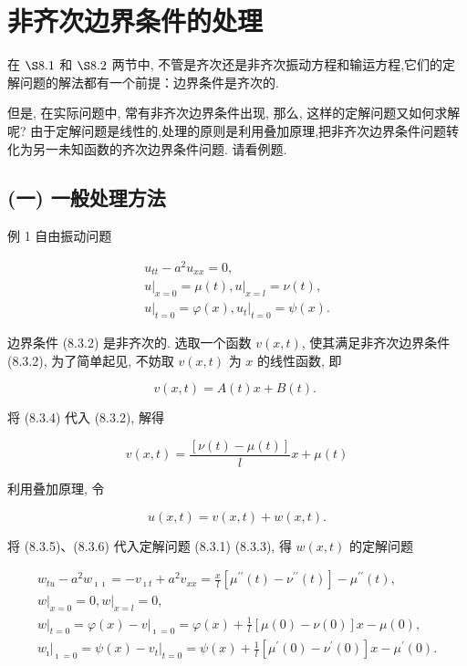 \section{非齐次边界条件的处理}
\label{eq:inhomo_boundary}

在 $\S 8.1$ 和 $\S 8.2$ 两节中, 不管是齐次还是非齐次振动方程和输运方程,它们的定解问题的解法都有一个前提：边界条件是齐次的.

但是, 在实际问题中, 常有非齐次边界条件出现, 那么, 这样的定解问题又如何求解呢? 由于定解问题是线性的,处理的原则是利用叠加原理,把非齐次边界条件问题转化为另一未知函数的齐次边界条件问题. 请看例题.

\subsection{(一) 一般处理方法}
例 1 自由振动问题

$$
\begin{gathered}
u_{t t}-a^{2} u_{x x}=0, \\
\left.u\right|_{x=0}=\mu(t),\left.u\right|_{x=l}=\nu(t), \\
\left.u\right|_{t=0}=\varphi(x),\left.u_{t}\right|_{t=0}=\psi(x) .
\end{gathered}
$$

边界条件 (8.3.2) 是非齐次的.
选取一个函数 $v(x, t)$, 使其满足非齐次边界条件 (8.3.2), 为了简单起见, 不妨取 $v(x, t)$ 为 $x$ 的线性函数, 即

$$
v(x, t)=A(t) x+B(t) \text {. }
$$

将 (8.3.4) 代入 (8.3.2), 解得

$$
v(x, t)=\frac{[\nu(t)-\mu(t)]}{l} x+\mu(t)
$$

利用叠加原理, 令

$$
u(x, t)=v(x, t)+w(x, t) .
$$

将 (8.3.5)、(8.3.6) 代入定解问题 (8.3.1) (8.3.3), 得 $w(x, t)$ 的定解问题

$$
\begin{gathered}
w_{t u}-a^{2} w_{\imath \imath}=-v_{\imath t}+a^{2} v_{x x}=\frac{x}{l}\left[\mu^{\prime \prime}(t)-\nu^{\prime \prime}(t)\right]-\mu^{\prime \prime}(t), \\
\left.w\right|_{x=0}=0,\left.w\right|_{x=l}=0, \\
\left.w\right|_{t=0}=\varphi(x)-\left.v\right|_{\imath=0}=\varphi(x)+\frac{1}{l}[\mu(0)-\nu(0)] x-\mu(0), \\
\left.w_{\imath}\right|_{\imath=0}=\psi(x)-\left.v_{t}\right|_{t=0}=\psi(x)+\frac{1}{l}\left[\mu^{\prime}(0)-\nu^{\prime}(0)\right] x-\mu^{\prime}(0) .
\end{gathered}
$$

